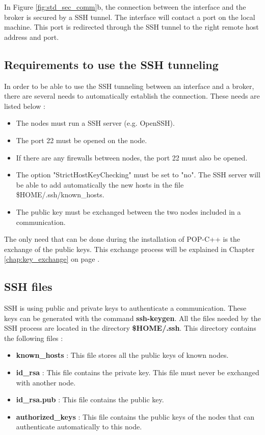 In Figure \ref{fig:std_sec_comm}b, the connection between the interface and the broker is secured by a SSH tunnel. The interface will contact a port on the local machine. This port is redirected through the SSH tunnel to the right remote host address and port.


\subsection{Requirements to use the SSH tunneling}
In order to be able to use the SSH tunneling between an interface and a broker, there are several needs to automatically establish the connection. These needs are listed below : \s
\begin{itemize}
\item The nodes must run a SSH server (e.g. OpenSSH).
\item The port 22 must be opened on the node.
\item If there are any firewalls between nodes, the port 22 must also be opened.
\item The option "StrictHostKeyChecking" must be set to "no". The SSH server will be able to add automatically the new hosts in the file \$HOME/.ssh/known\_hosts.
\item The public key must be exchanged between the two nodes included in a communication.
\end{itemize}\s
The only need that can be done during the installation of POP-C++ is the exchange of the public keys. This exchange process will be explained in Chapter \ref{chap:key_exchange} on page \pageref{chap:key_exchange}.


\subsection{SSH files}
SSH is using public and private keys to authenticate a communication. These keys can be generated with the command \textbf{ssh-keygen}. All the files needed by the SSH process are located in the directory \textbf{\$HOME/.ssh}. This directory contains the following files :  \begin{itemize}
\item \textbf{known\_hosts} : This file stores all the public keys of known nodes.
\item \textbf{id\_rsa} : This file contains the private key. This file must never be exchanged with another node. 
\item \textbf{id\_rsa.pub} : This file contains the public key.
\item \textbf{authorized\_keys} : This file contains the public keys of the nodes that can authenticate automatically to this node.
\end{itemize} 


